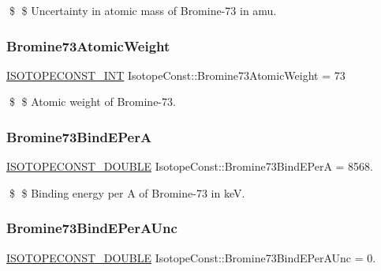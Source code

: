 \$ \$ Uncertainty in atomic mass of Bromine-\/73 in amu. \mbox{\label{group___isotope_const-_bromine-_br73_gaba5dfee0c044ceb527db9894838771bd}} 
\subsubsection{\texorpdfstring{Bromine73\+Atomic\+Weight}{Bromine73AtomicWeight}}
{\footnotesize\ttfamily \mbox{\hyperlink{group___isotope_const-_macros_ga5f18360b3e99483a35c32d789e62621c}{I\+S\+O\+T\+O\+P\+E\+C\+O\+N\+S\+T\+\_\+\+I\+NT}} Isotope\+Const\+::\+Bromine73\+Atomic\+Weight = 73}

\$ \$ Atomic weight of Bromine-\/73. \mbox{\label{group___isotope_const-_bromine-_br73_ga16be844cbd09561a8e124a71dd666f0e}} 
\subsubsection{\texorpdfstring{Bromine73\+Bind\+E\+PerA}{Bromine73BindEPerA}}
{\footnotesize\ttfamily \mbox{\hyperlink{group___isotope_const-_macros_ga8f45a7272ce02c0b4c65c44636ed719a}{I\+S\+O\+T\+O\+P\+E\+C\+O\+N\+S\+T\+\_\+\+D\+O\+U\+B\+LE}} Isotope\+Const\+::\+Bromine73\+Bind\+E\+PerA = 8568.}

\$ \$ Binding energy per A of Bromine-\/73 in keV. \mbox{\label{group___isotope_const-_bromine-_br73_ga1db11dd35479f5e58805e80059367f75}} 
\subsubsection{\texorpdfstring{Bromine73\+Bind\+E\+Per\+A\+Unc}{Bromine73BindEPerAUnc}}
{\footnotesize\ttfamily \mbox{\hyperlink{group___isotope_const-_macros_ga8f45a7272ce02c0b4c65c44636ed719a}{I\+S\+O\+T\+O\+P\+E\+C\+O\+N\+S\+T\+\_\+\+D\+O\+U\+B\+LE}} Isotope\+Const\+::\+Bromine73\+Bind\+E\+Per\+A\+Unc = 0.}

